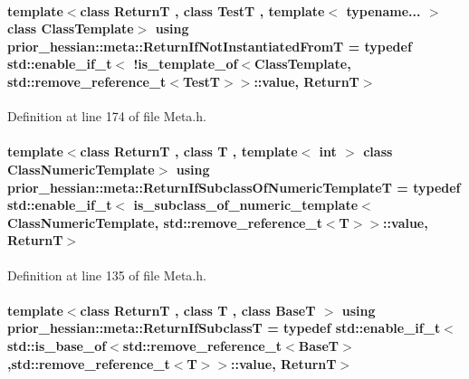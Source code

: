 \paragraph[{\texorpdfstring{Return\+If\+Not\+Instantiated\+FromT}{ReturnIfNotInstantiatedFromT}}]{\setlength{\rightskip}{0pt plus 5cm}template$<$class ReturnT , class TestT , template$<$ typename... $>$ class Class\+Template$>$ using {\bf prior\+\_\+hessian\+::meta\+::\+Return\+If\+Not\+Instantiated\+FromT} = typedef std\+::enable\+\_\+if\+\_\+t$<$ !{\bf is\+\_\+template\+\_\+of}$<$Class\+Template, std\+::remove\+\_\+reference\+\_\+t$<$TestT$>$$>$\+::value, ReturnT$>$}\hypertarget{namespaceprior__hessian_1_1meta_aea50a7973fa87d00d93e526c23d14549}{}\label{namespaceprior__hessian_1_1meta_aea50a7973fa87d00d93e526c23d14549}


Definition at line 174 of file Meta.\+h.

\paragraph[{\texorpdfstring{Return\+If\+Subclass\+Of\+Numeric\+TemplateT}{ReturnIfSubclassOfNumericTemplateT}}]{\setlength{\rightskip}{0pt plus 5cm}template$<$class ReturnT , class T , template$<$ int $>$ class Class\+Numeric\+Template$>$ using {\bf prior\+\_\+hessian\+::meta\+::\+Return\+If\+Subclass\+Of\+Numeric\+TemplateT} = typedef std\+::enable\+\_\+if\+\_\+t$<$ {\bf is\+\_\+subclass\+\_\+of\+\_\+numeric\+\_\+template}$<$Class\+Numeric\+Template, std\+::remove\+\_\+reference\+\_\+t$<$T$>$$>$\+::value, ReturnT$>$}\hypertarget{namespaceprior__hessian_1_1meta_a05320676e0242ae8def463a1afee362c}{}\label{namespaceprior__hessian_1_1meta_a05320676e0242ae8def463a1afee362c}


Definition at line 135 of file Meta.\+h.

\paragraph[{\texorpdfstring{Return\+If\+SubclassT}{ReturnIfSubclassT}}]{\setlength{\rightskip}{0pt plus 5cm}template$<$class ReturnT , class T , class BaseT $>$ using {\bf prior\+\_\+hessian\+::meta\+::\+Return\+If\+SubclassT} = typedef std\+::enable\+\_\+if\+\_\+t$<$ std\+::is\+\_\+base\+\_\+of$<$std\+::remove\+\_\+reference\+\_\+t$<$BaseT$>$,std\+::remove\+\_\+reference\+\_\+t$<$T$>$$>$\+::value, ReturnT$>$}\hypertarget{namespaceprior__hessian_1_1meta_a955cdfa0e628ca7f179af6ab70e87cdd}{}\label{namespaceprior__hessian_1_1meta_a955cdfa0e628ca7f179af6ab70e87cdd}


